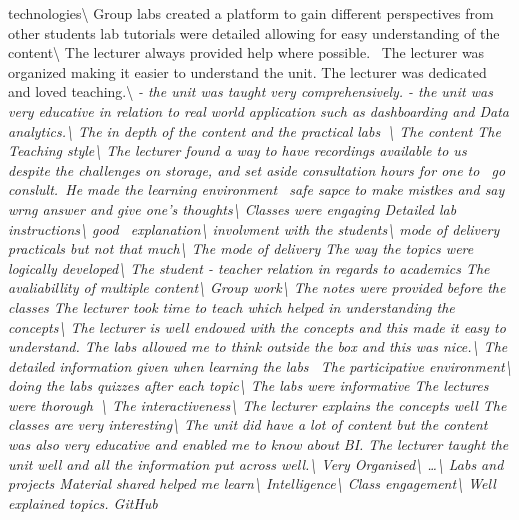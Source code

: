 \documentclass[
]{article}
\begin{document}
technologies\textbackslash{} \hline Group labs created a platform to
gain different perspectives from other students lab tutorials were
detailed allowing for easy understanding of the content\textbackslash{}
\hline The lecturer always provided help where possible.~ The lecturer
was organized making it easier to understand the unit. The lecturer was
dedicated and loved teaching.\textbackslash{} \hline \emph{- the unit
was taught very comprehensively. - the unit was very educative in
relation to real world application such as dashboarding and Data
analytics.\textbackslash{} \hline The in depth of the content and the
practical labs~\textbackslash{} \hline The content The Teaching
style\textbackslash{} \hline The lecturer found a way to have recordings
available to us despite the challenges on storage, and set aside
consultation hours for one to~ go conslult.~He made the learning
environment~ safe sapce to make mistkes and say wrng answer and give
one's thoughts\textbackslash{} \hline Classes were engaging Detailed lab
instructions\textbackslash{} \hline good~ explanation\textbackslash{}
\hline involvment with the students\textbackslash{} \hline mode of
delivery practicals but not that much\textbackslash{} \hline The mode of
delivery The way the topics were logically developed\textbackslash{}
\hline The student - teacher relation in regards to academics The
avaliabillity of multiple content\textbackslash{} \hline Group
work\textbackslash{} \hline The notes were provided before the classes
The lecturer took time to teach which helped in understanding the
concepts\textbackslash{} \hline The lecturer is well endowed with the
concepts and this made it easy to understand. The labs allowed me to
think outside the box and this was nice.\textbackslash{} \hline The
detailed information given when learning the labs~ The participative
environment\textbackslash{} \hline doing the labs quizzes after each
topic\textbackslash{} \hline The labs were informative The lectures were
thorough~\textbackslash{} \hline The interactiveness\textbackslash{}
\hline The lecturer explains the concepts well The classes are very
interesting\textbackslash{} \hline The unit did have a lot of content
but the content was also very educative and enabled me to know about BI.
The lecturer taught the unit well and all the information put across
well.\textbackslash{} \hline Very Organised\textbackslash{} \hline
\ldots\textbackslash{} \hline Labs and projects Material shared helped
me learn\textbackslash{} \hline Intelligence\textbackslash{} \hline
Class engagement\textbackslash{} \hline Well explained topics. GitHub
}
\end{document}
